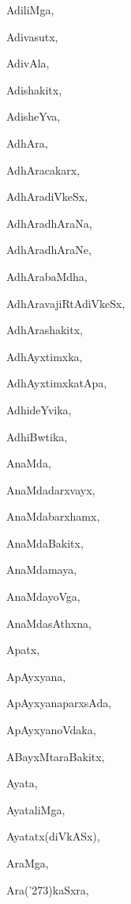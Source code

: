 \begin{multicols}{2}
{AdiliMga}, \pageref{AdiliMga}

{Adivasutx}, \pageref{Adivasutx}

{AdivAla}, \pageref{AdivAla}

{Adishakitx}, \pageref{Adishakitx}

{AdisheYva}, \pageref{AdisheYva}

{AdhAra}, \pageref{AdhAra}

{AdhAracakarx}, \pageref{AdhAracakarx}

{AdhAradiVkeSx}, \pageref{AdhAradiVkeSx}

{AdhAradhAraNa}, \pageref{AdhAradhAraNa}

{AdhAradhAraNe}, \pageref{AdhAradhAraNe}

{AdhArabaMdha}, \pageref{AdhArabaMdha}

{AdhAravajiRtAdiVkeSx}, \pageref{AdhAravajiRtAdiVkeSx}

{AdhArashakitx}, \pageref{AdhArashakitx}

{AdhAyxtimxka}, \pageref{AdhAyxtimxka}

{AdhAyxtimxkatApa}, \pageref{AdhAyxtimxkatApa}

{AdhideYvika}, \pageref{AdhideYvika}

{AdhiBwtika}, \pageref{AdhiBwtika}

{AnaMda}, \pageref{AnaMda}

{AnaMdadarxvayx}, \pageref{AnaMdadarxvayx}

{AnaMdabarxhamx}, \pageref{AnaMdabarxhamx}

{AnaMdaBakitx}, \pageref{AnaMdaBakitx}

{AnaMdamaya}, \pageref{AnaMdamaya}

{AnaMdayoVga}, \pageref{AnaMdayoVga}

{AnaMdasAthxna}, \pageref{AnaMdasAthxna}

{Apatx}, \pageref{Apatx}

{ApAyxyana}, \pageref{ApAyxyana}

{ApAyxyanaparxsAda}, \pageref{ApAyxyanaparxsAda}

{ApAyxyanoVdaka}, \pageref{ApAyxyanoVdaka}

{ABayxMtaraBakitx}, \pageref{ABayxMtaraBakitx}

{Ayata}, \pageref{Ayata}

{AyataliMga}, \pageref{AyataliMga}

{Ayatatx(diVkASx)}, \pageref{Ayatatx(diVkASx)}

{AraMga}, \pageref{AraMga}

{Ara(\char'273)kaSxra}, \pageref{Ara(273)kaSxra}


\end{multicols}
